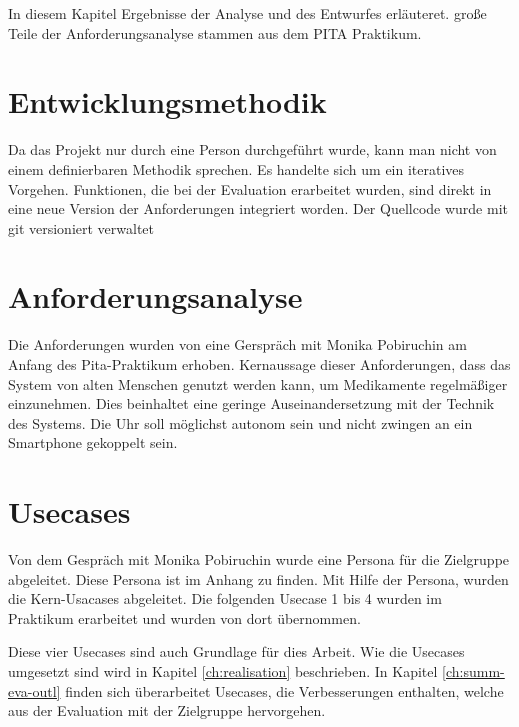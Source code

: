 In diesem Kapitel Ergebnisse der Analyse und des Entwurfes erläuteret. große Teile der Anforderungsanalyse stammen aus dem PITA Praktikum.
\section{Entwicklungsmethodik}
Da das Projekt nur durch eine Person durchgeführt wurde, kann man nicht von einem definierbaren Methodik sprechen. Es handelte sich um ein iteratives Vorgehen. Funktionen, die bei der Evaluation erarbeitet wurden, sind direkt in eine neue Version der Anforderungen integriert worden. Der Quellcode wurde mit \gls{git} versioniert verwaltet
\section{Anforderungsanalyse}
Die Anforderungen wurden von eine Gerspräch mit Monika Pobiruchin am Anfang des Pita-Praktikum erhoben. Kernaussage dieser Anforderungen, dass das System von alten Menschen genutzt werden kann, um Medikamente regelmäßiger einzunehmen. Dies beinhaltet eine geringe Auseinandersetzung mit der Technik des Systems. Die Uhr soll möglichst autonom sein und nicht zwingen an ein Smartphone gekoppelt sein.

\section{Usecases} 
Von dem Gespräch mit Monika Pobiruchin wurde eine Persona für die Zielgruppe abgeleitet. Diese Persona ist im Anhang zu finden.
Mit Hilfe der Persona, wurden die Kern-Usacases abgeleitet. Die folgenden Usecase 1 bis 4 wurden im Praktikum erarbeitet und wurden von dort übernommen. 

Diese vier Usecases sind auch Grundlage für dies Arbeit. Wie die Usecases umgesetzt sind wird in Kapitel \ref{ch:realisation} beschrieben. In Kapitel \ref{ch:summ-eva-outl} finden sich überarbeitet Usecases, die Verbesserungen enthalten, welche aus der Evaluation mit der Zielgruppe hervorgehen.

